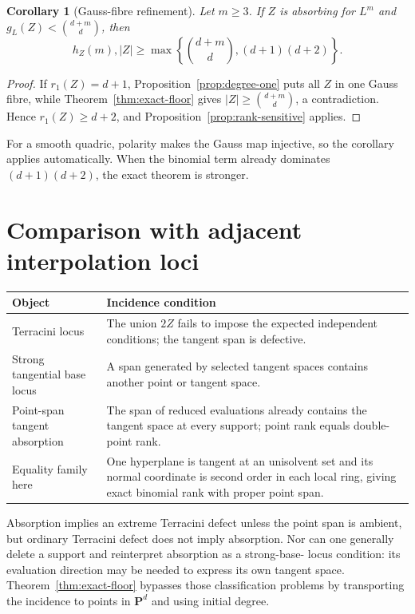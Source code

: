 \documentclass[11pt]{article}
\newtheorem{corollary}[theorem]{Corollary}
\newcommand{\PP}{\mathbf P}
\begin{document}
\begin{corollary}[Gauss-fibre refinement]\label{cor:gauss}
Let $m\geq3$.  If $Z$ is absorbing for $L^m$ and
$g_L(Z)<\binom{d+m}{d}$, then
\[
 h_Z(m),|Z|\geq
 \max\left\{\binom{d+m}{d},(d+1)(d+2)\right\}.
\]
\end{corollary}

\begin{proof}
If $r_1(Z)=d+1$, Proposition~\ref{prop:degree-one} puts all $Z$ in one Gauss
fibre, while Theorem~\ref{thm:exact-floor} gives
$|Z|\geq\binom{d+m}{d}$, a contradiction.  Hence $r_1(Z)\geq d+2$, and
Proposition~\ref{prop:rank-sensitive} applies.
\end{proof}

For a smooth quadric, polarity makes the Gauss map injective, so the
corollary applies automatically.  When the binomial term already dominates
$(d+1)(d+2)$, the exact theorem is stronger.

\section{Comparison with adjacent interpolation loci}\label{sec:comparison}

\begin{center}
\begin{tabular}{p{}p{}}
\toprule
Object & Incidence condition \\
\midrule
Terracini locus & The union $2Z$ fails to impose the expected independent
conditions; the tangent span is defective. \\
Strong tangential base locus & A span generated by selected tangent spaces
contains another point or tangent space. \\
Point-span tangent absorption & The span of reduced evaluations already
contains the tangent space at every support; point rank equals double-point
rank. \\
Equality family here & One hyperplane is tangent at an unisolvent set and its
normal coordinate is second order in each local ring, giving exact binomial
rank with proper point span. \\
\bottomrule
\end{tabular}
\end{center}

Absorption implies an extreme Terracini defect unless the point span is
ambient, but ordinary Terracini defect does not imply absorption.  Nor can
one generally delete a support and reinterpret absorption as a strong-base-
locus condition: its evaluation direction may be needed to express its own
tangent space.  Theorem~\ref{thm:exact-floor} bypasses those classification
problems by transporting the incidence to points in $\PP^d$ and using initial
degree.
\end{document}
